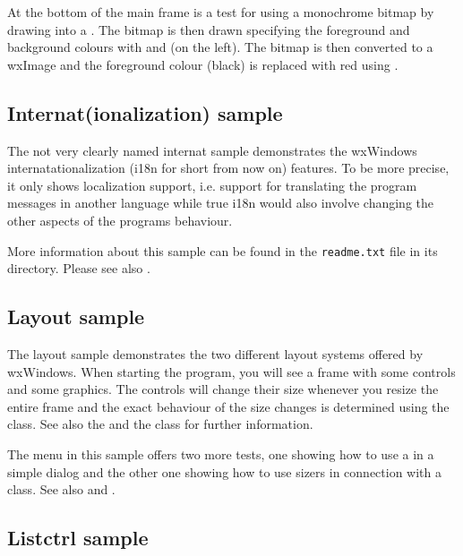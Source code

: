 At the bottom of the main frame is a test for using a monochrome bitmap by
drawing into a . The bitmap is then drawn
specifying the foreground and background colours with 
 and 
 (on the left). The
bitmap is then converted to a wxImage and the foreground colour (black) is
replaced with red using .


\subsection{Internat(ionalization) sample}\label{sampleinternat}

The not very clearly named internat sample demonstrates the wxWindows
internatationalization (i18n for short from now on) features. To be more
precise, it only shows localization support, i.e. support for translating the
program messages in another language while true i18n would also involve
changing the other aspects of the programs behaviour.

More information about this sample can be found in the {\tt readme.txt} file in
its directory. Please see also .


\subsection{Layout sample}\label{samplelayout}

The layout sample demonstrates the two different layout systems offered
by wxWindows. When starting the program, you will see a frame with some
controls and some graphics. The controls will change their size whenever
you resize the entire frame and the exact behaviour of the size changes
is determined using the  
class. See also the  and the 
class for further information.

The menu in this sample offers two more tests, one showing how to use
a  in a simple dialog and the other one
showing how to use sizers in connection with a  
class. See also  and 
.


\subsection{Listctrl sample}\label{samplelistctrl}

